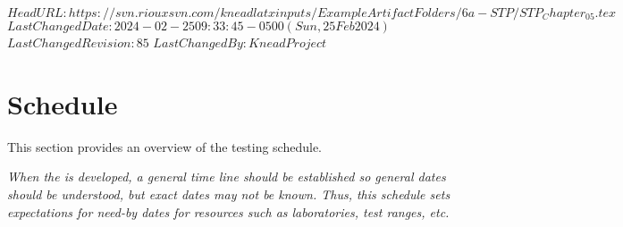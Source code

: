 \svnidlong
{$HeadURL: https://svn.riouxsvn.com/kneadlatxinputs/ExampleArtifactFolders/6a-STP/STP_Chapter_05.tex $}
{$LastChangedDate: 2024-02-25 09:33:45 -0500 (Sun, 25 Feb 2024) $}
{$LastChangedRevision: 85 $}
{$LastChangedBy: KneadProject $}


\chapter{Schedule}
\label{loc:Schedule}

This section provides an overview of the testing schedule.

{\em When the \STP is developed, a general time line should be established so general dates should be understood, but exact dates may not be known.
Thus, this schedule sets expectations for need-by dates for resources such as laboratories, test ranges, etc.}